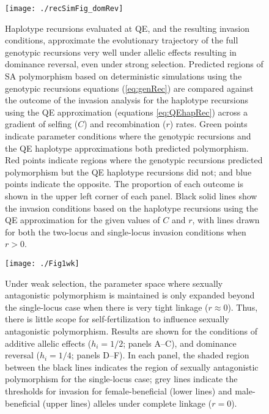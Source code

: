 \documentclass{article}
\begin{document}
\begin{figure}[H] 
\texttt{[image: ./recSimFig\_domRev]}
\caption{Haplotype recursions evaluated at QE, and the resulting invasion conditions, approximate the evolutionary trajectory of the full genotypic recursions very well under allelic effects resulting in dominance reversal, even under strong selection. Predicted regions of SA polymorphism based on deterministic simulations using the genotypic recursions equations (\ref{eq:genRec}) are compared against the outcome of the invasion analysis for the haplotype recursions using the QE approximation (equations \ref{eq:QEhapRec}) across a gradient of selfing ($C$) and recombination ($r$) rates. Green points indicate parameter conditions where the genotypic recursions and the QE haplotype approximations both predicted polymorphism. Red points indicate regions where the genotypic recursions predicted polymorphism but the QE haplotype recursions did not; and blue points indicate the opposite. The proportion of each outcome is shown in the upper left corner of each panel. Black solid lines show the invasion conditions based on the haplotype recursions using the QE approximation for the given values of $C$ and $r$, with lines drawn for both the two-locus and single-locus invasion conditions when $r > 0$.}
\label{fig:domRevSim}
\end{figure}
\newpage{}


\begin{figure}[H]
\texttt{[image: ./Fig1wk]}
\caption{Under weak selection, the parameter space where sexually antagonistic polymorphism is maintained is only expanded beyond the single-locus case when there is very tight linkage ($r \approx 0$). Thus, there is little scope for self-fertilization to influence sexually antagonistic polymorphism. Results are shown for the conditions of additive allelic effects ($h_i = 1/2$; panels A--C), and dominance reversal ($h_i = 1/4$; panels D--F). In each panel, the shaded region between the black lines indicates the region of sexually antagonistic polymorphism for the single-locus case; grey lines indicate the thresholds for invasion for female-beneficial (lower lines) and male-beneficial (upper lines) alleles under complete linkage ($r = 0$).}
\label{fig:wkSel}
\end{figure}
\newpage{}


\end{document}
